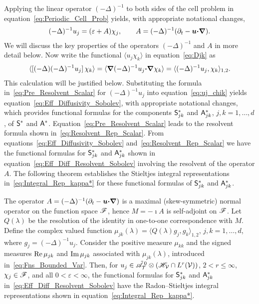 \documentclass[amsa]{ipart}
\begin{document}
Applying the linear operator $(-\Delta)^{-1}$ to both sides of the cell
problem in equation~\eqref{eq:Periodic_Cell_Prob} yields, with
appropriate notational changes,
%
\begin{align}\label{eq:Pre_Resolvent_Scalar}
  (-\Delta)^{-1}u_j=(\varepsilon+A)\chi_j,
  \qquad
  A=(-\Delta)^{-1}(\partial_t-\vecu \bcdot\bnabla).
\end{align}
%
We will discuss the key properties of the operators $(-\Delta)^{-1}$ and
$A$ in more detail below.  Now write the functional $\langle u_j\chi_k\rangle$ in 
equation~\eqref{eq:Djk} as~\cite{Pavliotis:PHD_Thesis}       
%
\begin{align}\label{eq:uj_chik}
  \langle[(-\Delta)(-\Delta)^{-1}u_j]\,\chi_k\rangle
       =\langle\bnabla(-\Delta)^{-1}u_j\bcdot\bnabla \chi_k\rangle
       =\langle(-\Delta)^{-1}u_j,\chi_k\rangle_{1,2}.
\end{align}
%
This calculation will be justified below. Substituting the  
formula in~\eqref{eq:Pre_Resolvent_Scalar} for $(-\Delta)^{-1}u_j$ 
into equation~\eqref{eq:uj_chik} yields
equation~\eqref{eq:Eff_Diffusivity_Sobolev}, with appropriate
notational changes, which provides functional
formulas for the components
$\mathsf{S}^*_{jk}$ and $\mathsf{A}^*_{jk}$, $j,k=1,\ldots,d$, of $\mathsf{S}^*$ and $\mathsf{A}^*$.
Equation~\eqref{eq:Pre_Resolvent_Scalar}   
leads to the resolvent formula shown
in~\eqref{eq:Resolvent_Rep_Scalar}.  
From equations~\eqref{eq:Eff_Diffusivity_Sobolev}
and~\eqref{eq:Resolvent_Rep_Scalar} we have the functional formulas
for $\mathsf{S}^*_{jk}$ and $\mathsf{A}^*_{jk}$ shown in 
equation~\eqref{eq:Eff_Diff_Resolvent_Sobolev} involving the resolvent
of the operator $A$. The following theorem establishes the 
Stieltjes integral representations  in~\eqref{eq:Integral_Rep_kappa*}
for these functional formulas of $\mathsf{S}^*_{jk}$ and $\mathsf{A}^*_{jk}$. 



%
\begin{theorem}\label{thm:Integral_Reps}
  The operator $A=(-\Delta)^{-1}(\partial_t-\boldsymbol{u}\mbox{\boldmath${\cdot}$}\mbox{\boldmath${\nabla}$})$ is a maximal
  (skew-symmetric) normal operator on the function space $\mathscr{F}$, hence
  $M=-\imath A$ is self-adjoint on $\mathscr{F}$. Let $Q(\lambda)$ be the resolution of
  the identity in one-to-one correspondence with $M$. Define the
  complex valued function $\mu_{jk}(\lambda)=\langle Q(\lambda)g_j,g_k\rangle_{1,2}$,
  $j,k=1,\ldots,d$, where $g_j=(-\Delta)^{-1}u_j$. Consider the positive measure
  $\mu_{kk}$ and the signed measures $\mbox{Re}\,\mu_{jk}$ and $\mbox{Im}\,\mu_{jk}$
  associated with $\mu_{jk}(\lambda)$, introduced
  in~\eqref{eq:Fns_Bounded_Var}.  Then, for
  $u_j\in\tilde{\mathscr{A}}^{\,0}_{\mathcal{T}}\otimes(\mathscr{H}_{\mathcal{V}}\cap L^r(\mathcal{V}))$, $2<r\leq\infty$,
  $\chi_j\in\mathscr{F}$, and all $0<\varepsilon<\infty$, the functional formulas for $\mathsf{S}^*_{jk}$
  and $\mathsf{A}^*_{jk}$ in~\eqref{eq:Eff_Diff_Resolvent_Sobolev} have the
  Radon--Stieltjes integral representations shown in
  equation~\eqref{eq:Integral_Rep_kappa*}.     
% 
\end{theorem}
%
\end{document}
